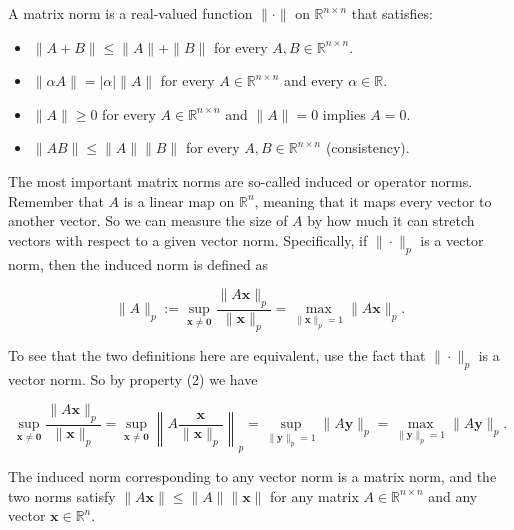 \begin{definition}
  A matrix norm is a real-valued function \(\|\cdot\|\) on \(\mathbb{R}^{n \times n}\) that satisfies:
\begin{itemize}
\item[1.] \(\|A+B\| \leq\|A\|+\|B\|\) for every \(A, B \in \mathbb{R}^{n \times n}\).
\item[2.] \(\|\alpha A\|=|\alpha|\|A\|\) for every \(A \in \mathbb{R}^{n \times n}\) and every \(\alpha \in \mathbb{R}\).
\item[3.] \(\|A\| \geq 0\) for every \(A \in \mathbb{R}^{n \times n}\) and \(\|A\|=0\) implies \(A=0\).
\item[4.] \(\|A B\| \leq\|A\|\|B\|\) for every \(A, B \in \mathbb{R}^{n \times n}\) (consistency).
\end{itemize}
\end{definition}

\begin{definition}
  
The most important matrix norms are so-called induced or operator norms. Remember that \(A\) is a linear map on \(\mathbb{R}^n\), meaning that it maps every vector to another vector. So we can measure the size of \(A\) by how much it can stretch vectors with respect to a given vector norm. Specifically, if \(\|\cdot\|_p\) is a vector norm, then the induced norm is defined as

\[
\|A\|_p:=\sup _{\mathbf{x} \neq \mathbf{0}} \frac{\|A \mathbf{x}\|_p}{\|\mathbf{x}\|_p}=\max _{\|\mathbf{x}\|_p=1}\|A \mathbf{x}\|_p .
\]

To see that the two definitions here are equivalent, use the fact that \(\|\cdot\|_p\) is a vector norm. So by property (2) we have

\[
\sup _{\mathbf{x} \neq \mathbf{0}} \frac{\|A \mathbf{x}\|_p}{\|\mathbf{x}\|_p}=\sup _{\mathbf{x} \neq \mathbf{0}}\left\|A \frac{\mathbf{x}}{\|\mathbf{x}\|_p}\right\|_p=\sup _{\|\mathbf{y}\|_p=1}\|A \mathbf{y}\|_p=\max _{\|\mathbf{y}\|_p=1}\|A \mathbf{y}\|_p .
\]

\end{definition}

\begin{theorem}
  The induced norm corresponding to any vector norm is a matrix norm, and the two norms satisfy \(\|A \mathbf{x}\| \leq\|A\|\|\mathbf{x}\|\) for any matrix \(A \in \mathbb{R}^{n \times n}\) and any vector \(\mathbf{x} \in \mathbb{R}^n\).
\end{theorem}


